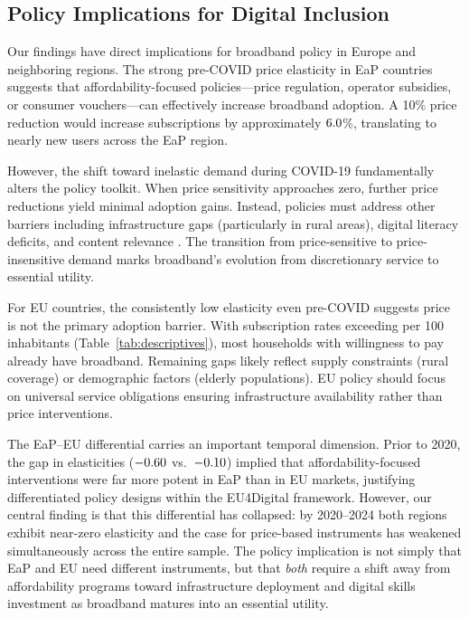 \subsection{Policy Implications for Digital Inclusion}

Our findings have direct implications for broadband policy in Europe and neighboring regions. The strong pre-COVID price elasticity in EaP countries suggests that affordability-focused policies---price regulation, operator subsidies, or consumer vouchers---can effectively increase broadband adoption. A 10\% price reduction would increase subscriptions by approximately $6.0$\%, translating to nearly \EaPAddSubsTotal{} new users across the EaP region.

However, the shift toward inelastic demand during COVID-19 fundamentally alters the policy toolkit. When price sensitivity approaches zero, further price reductions yield minimal adoption gains. Instead, policies must address other barriers including infrastructure gaps (particularly in rural areas), digital literacy deficits, and content relevance \citep{guermazi2021broadband}. The transition from price-sensitive to price-insensitive demand marks broadband's evolution from discretionary service to essential utility.

For EU countries, the consistently low elasticity even pre-COVID suggests price is not the primary adoption barrier. With subscription rates exceeding \DescSubsEU{} per 100 inhabitants (Table~\ref{tab:descriptives}), most households with willingness to pay already have broadband. Remaining gaps likely reflect supply constraints (rural coverage) or demographic factors (elderly populations). EU policy should focus on universal service obligations ensuring infrastructure availability rather than price interventions.

The EaP--EU differential carries an important temporal dimension. Prior to 2020, the gap in elasticities ($-0.60$ vs.\ $-0.10$) implied that affordability-focused interventions were far more potent in EaP than in EU markets, justifying differentiated policy designs within the EU4Digital framework. However, our central finding is that this differential has collapsed: by 2020--2024 both regions exhibit near-zero elasticity and the case for price-based instruments has weakened simultaneously across the entire sample. The policy implication is not simply that EaP and EU need different instruments, but that \emph{both} require a shift away from affordability programs toward infrastructure deployment and digital skills investment as broadband matures into an essential utility.


